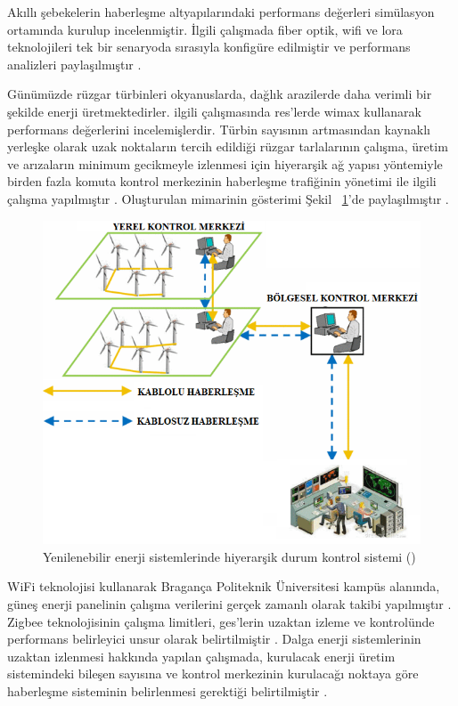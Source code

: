 Akıllı şebekelerin haberleşme altyapılarındaki performans değerleri simülasyon ortamında kurulup incelenmiştir. İlgili çalışmada fiber optik, \gls{wifi} ve \gls{lora} teknolojileri tek bir senaryoda sırasıyla konfigüre edilmiştir ve performans analizleri paylaşılmıştır \cite{yuan2020modeling}. 



Günümüzde rüzgar türbinleri okyanuslarda, dağlık arazilerde daha verimli bir şekilde enerji üretmektedirler. \cite{liu2010status} ilgili çalışmasında \gls{res}'lerde \gls{wimax} kullanarak performans değerlerini incelemişlerdir. Türbin sayısının artmasından kaynaklı yerleşke olarak uzak noktaların tercih edildiği rüzgar tarlalarının çalışma, üretim ve arızaların minimum gecikmeyle izlenmesi için hiyerarşik ağ yapısı yöntemiyle birden fazla komuta kontrol merkezinin haberleşme trafiğinin yönetimi ile ilgili çalışma yapılmıştır \cite{hussain2014multilayer}. Oluşturulan mimarinin gösterimi Şekil ~\ref{fig:figure6}'de paylaşılmıştır .






\begin{figure}[htbp]
\centerline{\includegraphics[width= 8 cm]{Resim/Screenshot 2022-06-12 at 21.27.08.png}}
\caption{Yenilenebilir enerji sistemlerinde hiyerarşik durum kontrol sistemi (\protect{}) }
\label{fig:figure6}
\end{figure}

WiFi teknolojisi kullanarak Bragança Politeknik Üniversitesi kampüs alanında, güneş enerji panelinin çalışma verilerini gerçek zamanlı olarak takibi yapılmıştır \cite{delly2022solar}.
Zigbee teknolojisinin çalışma limitleri, \gls{ges}'lerin uzaktan izleme ve kontrolünde performans belirleyici unsur olarak belirtilmiştir \cite{9670354}. Dalga enerji sistemlerinin uzaktan izlenmesi hakkında yapılan çalışmada, kurulacak enerji üretim sistemindeki bileşen sayısına ve kontrol merkezinin kurulacağı noktaya göre haberleşme sisteminin belirlenmesi gerektiği belirtilmiştir \cite{johanson2019condition}.




